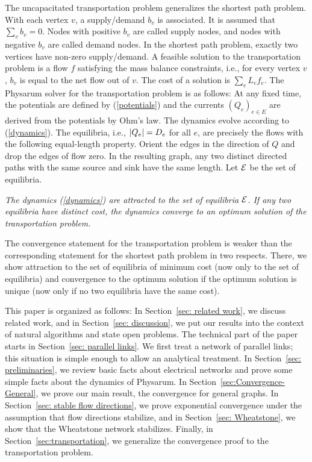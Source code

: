 \documentclass[11pt,a4paper]{article}
\newcommand{\firsttheorem}[2]{\medskip\par\noindent{\bf Theorem #1} {\it
#2}\medskip}
\newcommand{\E}{\cal E}
\begin{document}
The uncapacitated transportation problem generalizes the shortest
path problem. With each vertex $v$, a
supply/demand $b_v$ is associated. It is assumed that $\sum_v b_v = 0$. Nodes
with positive $b_v$ are called supply nodes, and nodes with negative $b_v$ are
called demand nodes. In the shortest path problem, exactly two vertices have
non-zero supply/demand. A feasible solution to the transportation problem is a
flow $f$ satisfying the mass balance constraints, i.e., for every vertex $v$,
$b_v$ is equal to the net flow out of $v$. The cost of a solution is $\sum_e
L_e f_e$. The Physarum solver for the transportation problem is as follows: At any
fixed time, the potentials are defined by (\ref{potentials}) and the currents
$(Q_e)_{e \in E}$ are derived from the potentials by Ohm's law. 
The dynamics evolve according to (\ref{dynamics}). The
equilibria, i.e., $| Q_e | = D_e$ for all $e$, are precisely the flows with
the following equal-length property. Orient the edges in the direction of $Q$ and drop
the edges of flow zero. In the resulting graph, any two distinct directed paths with the same
source and sink have the same length. Let $\E$ be the set of equilibria. 

\firsttheorem{[Theorem~\ref{thm:main transportation} in Section~\ref{sec:transportation}]}{The
dynamics (\ref{dynamics}) are attracted to the set of equilibria $\E$. If any two
equilibria have distinct cost, the dynamics converge to an optimum solution of
the transportation problem.}

The convergence statement for the transportation problem is weaker than the
corresponding statement for the shortest path problem in two respects. There, we show attraction to
the set of equilibria of minimum cost (now only to the set of equilibria) and
convergence to the optimum solution if the optimum solution is unique (now only
if no two equilibria have the same cost). 

This paper is organized as follows: In Section~\ref{sec: related work}, we
discuss related work, and in Section~\ref{sec: discussion}, we put our results
into the context of natural algorithms and state open problems. The technical
part of the paper starts in Section~\ref{sec: parallel links}. We first treat a
network of parallel links; this situation is simple enough to allow an
analytical treatment. In Section~\ref{sec: preliminaries}, we review basic facts
about electrical networks and prove some simple facts about the dynamics of
Physarum. In Section~\ref{sec:Convergence-General}, we prove our main result,
the convergence for general graphs. In Section~\ref{sec: stable flow directions},
we prove exponential convergence under the assumption that flow directions
stabilize, and in Section~\ref{sec: Wheatstone}, we show that the Wheatstone
network stabilizes. Finally, in Section~\ref{sec:transportation}, we generalize
the convergence proof to the transportation problem. 
\end{document}
